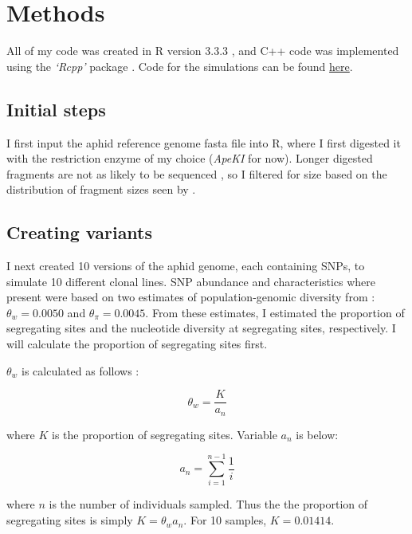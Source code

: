 
\section{Methods}


All of my code was created in R version 3.3.3 \citep{RCoreTeam:2014wf}, and C++ code was 
implemented using the \emph{`Rcpp'} package \citep{Eddelbuettel:2013if}.
Code for the simulations can be found \href{https://github.com/lucasnell/mol_ecol}{here}.

\subsection{Initial steps}

I first input the aphid reference genome fasta file into R, where I first digested it 
with the restriction enzyme of my choice (\emph{ApeKI} for now).
Longer digested fragments are not as likely to be sequenced 
\citep{Andrews:2016bc,Elshire:2011gn}, so I filtered for size based on the distribution 
of fragment sizes seen by \citet{Elshire:2011gn}.


\subsection{Creating variants}

I next created 10 versions of the aphid genome, each containing SNPs, to simulate
10 different clonal lines.
SNP abundance and characteristics where present were based on two estimates of 
population-genomic diversity from \citet{Bickel:2013hy}: $\theta_w = 0.0050$ and 
$\theta_{\pi} = 0.0045$.
From these estimates, I estimated the proportion of segregating sites and the nucleotide 
diversity at segregating sites, respectively. 
I will calculate the proportion of segregating sites first.

$\theta_w$ is calculated as follows \citep{Watterson:1975bh}:

\begin{equation} \label{eq:watterson} 
    \theta_w = \frac{ K }{ a_n }
\end{equation}

where $K$ is the proportion of segregating sites. Variable $a_n$ is below:

\begin{equation} \label{eq:a_n}
    a_n = \sum_{i=1}^{n-1} \frac{1}{i}
\end{equation}

where $n$ is the number of individuals sampled.
Thus the the proportion of segregating sites is simply $K = \theta_w a_n$.
For 10 samples, $K = 0.01414$.

